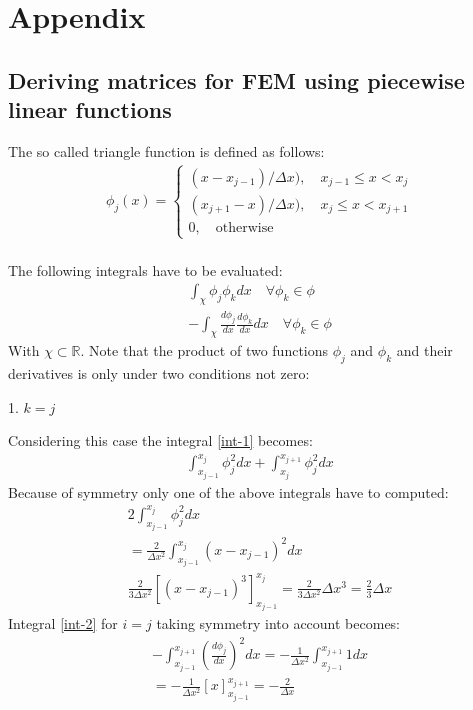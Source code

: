 \chapter{Appendix}
\section{Deriving matrices for FEM using piecewise linear functions} \label{ap-mat-der}
The so called triangle function is defined as follows:
\begin{gather}
    \phi_j(x)= 
\begin{cases}
    (x - x_{j-1}) / \Delta x), \quad x_{j-1} \leq x <  x_{j}\\
    (x_{j+1} - x) / \Delta x), \quad x_{j} \leq x <  x_{j + 1}\\
    0,              \quad \text{otherwise}
\end{cases} \label{def-phi}
\end{gather}
\cite{Gustafsson2011d} \\
The following integrals have to be evaluated:
\begin{gather}
\int_{\chi} \phi_{j}\phi_{k}dx \quad \forall \phi_{k} \in \phi   \label{int-1} \\
-\int_{\chi} \frac{d\phi_{j}}{dx}\frac{d\phi_{k}}{dx}dx  \quad \forall \phi_{k} \in \phi  \label{int-2}
\end{gather}
With \(\chi \subset \mathbb{R}\). 
Note that the product of two functions \(\phi_j\) and \(\phi_k\) and their derivatives is only under two conditions not zero:

1. \(k = j\)

Considering this case the integral  \ref{int-1} becomes:
\begin{gather}
\int_{x_{j-1}}^{x_{j}} \phi_j^{2} dx + \int_{x_{j}}^{x_{j+1}} \phi_j^{2} dx 
\end{gather}
Because of symmetry only one of the above integrals have to computed:
\begin{gather}
2 \int_{x_{j-1}}^{x_{j}} \phi_j^{2} dx \\
= \frac{2}{\Delta x^2} \int_{x_{j-1}}^{x_{j}} (x-x_{j-1})^{2} dx \\
\frac{2}{3 \Delta x^{2}} \left[ (x - x_{j-1})^3\right]_{x_{j-1}}^{{x_j}} = \frac{2}{3 \Delta x^{2}} \Delta x^3 = \frac{2}{3}\Delta x
\end{gather}
Integral \ref{int-2} for \(i = j\) taking symmetry into account becomes:
\begin{gather}
-\int_{x_{j-1}}^{x_{j+1}} (\frac{d \phi_j}{dx})^2 dx = -\frac{1}{\Delta x^2} \int_{x_{j-1}}^{x_{j+1}} 1 dx\\
 = -\frac{1}{\Delta x^2}  \left[ x \right]_{x_{j-1}}^{x_{j+1}} = -\frac{2}{\Delta x}
\end{gather}

